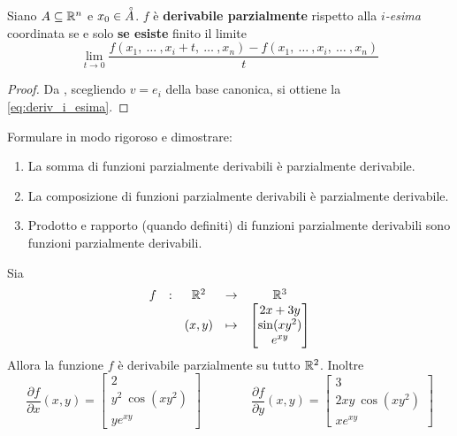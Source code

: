 \begin{proposition}
	Siano $A \subseteq \mathbb{R}^n$ e $x_0 \in \accentset{\circ}{A}$. $f$ è \textbf{derivabile parzialmente} rispetto alla $i$\textit{-esima} coordinata se e solo \textbf{se esiste} finito il limite
	\begin{equation}
		\label{eq:deriv_i_esima}
		\lim\limits_{t \to 0} \frac{f(x_1,\:\dotsc\:,x_i+t,\:\dotsc\:,x_n) - f(x_1,\:\dotsc\:,x_i,\:\dotsc\:,x_n)}{t}
	\end{equation}
	\begin{proof}
		Da , scegliendo $v = e_i$ della base canonica, si ottiene la \cref{eq:deriv_i_esima}.
	\end{proof}
\end{proposition}
\begin{exercise}
	\label{ex:funz_derivabili}
	Formulare in modo rigoroso e dimostrare:
	\begin{enumerate}
		\item La somma di funzioni parzialmente derivabili è parzialmente derivabile.
		\item La composizione di funzioni parzialmente derivabili è parzialmente derivabile.
		\item Prodotto e rapporto (quando definiti) di funzioni parzialmente derivabili sono funzioni parzialmente derivabili.
	\end{enumerate}
\end{exercise}
\begin{example}
	Sia
	\[
		\begin{array}{ccccc} {f} & : & {\mathbb{R}^2} & \to & {\mathbb{R}^3} \\ & & {(x,y)} & \mapsto & {
			\begin{bmatrix}
				2x + 3y\\
				\sin (xy^2)\\
				e^{xy}
			\end{bmatrix}
		} \\ \end{array}
	\]
	Allora la funzione $f$ è derivabile parzialmente su tutto $\mathbb{R}^2$. Inoltre
	\[
		\frac{\partial f}{\partial x}(x,y) =
		\begin{bmatrix}
			2\\
			y^2 \: \cos (xy^2)\\
			y e^{xy}
		\end{bmatrix}
		\qquad\qquad
		\frac{\partial f}{\partial y}(x,y) =
		\begin{bmatrix}
			3\\
			2xy \: \cos (xy^2)\\
			x e^{xy}
		\end{bmatrix}
	\]
\end{example}

